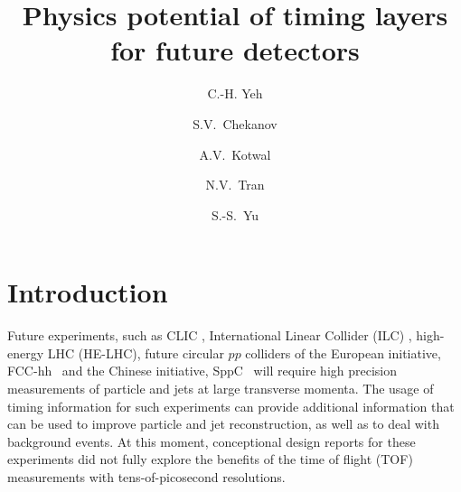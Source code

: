 \documentclass[final,1p,11pt]{elsarticle}
\begin{document}
\begin{frontmatter}

\title{
Physics potential of timing layers for future detectors}

\author[add3]{C.-H. Yeh}

\author[add1]{S.V.~Chekanov}

\author[addDuke]{A.V.~Kotwal}

\author[add2]{N.V.~Tran}

\author[add3]{S.-S.~Yu}

\address[add3]{
Department of Physics and Center for High Energy and High Field Physics, 
National Central University, Chung-Li, Taoyuan City 32001, Taiwan
}

\address[add1]{
HEP Division, Argonne National Laboratory,
9700 S.~Cass Avenue,
Argonne, IL 60439, USA. 
}

\address[addDuke]{
Department of Physics, Duke University, USA
}

\address[add2]{
Fermi National Accelerator Laboratory
}




\begin{abstract}

\end{abstract}

\begin{keyword}

\end{keyword}
\end{frontmatter}



\section{Introduction}

Future experiments, such as CLIC \cite{Linssen:1425915}, International Linear Collider (ILC) \cite{Behnke:2013xla}, high-energy LHC (HE-LHC),
future circular $pp$ colliders of the European initiative, FCC-hh~\cite{Benedikt:2206376} and the Chinese initiative, SppC~\cite{Tang:2015qga} will require high precision measurements of particle and jets 
at large transverse momenta. 
The usage of timing information for such experiments  can  provide additional 
information that can be used to improve particle and jet reconstruction, as well as to deal with background events.
At this moment, conceptional design reports for these experiments did not fully explore
the benefits of the time of flight (TOF) measurements with tens-of-picosecond resolutions.
\end{document}
